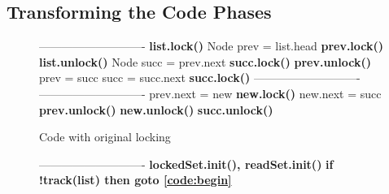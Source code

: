 \subsection{Transforming the Code Phases}\label{ssec:transformation}

\newcommand{\spOne}{\hspace{-3mm}\ }
\newcommand{\spZero}{\hspace{-3mm}}
\begin{figure*}
\codesize
	\begin{center}
	\begin{subfigure}[b]{.45\textwidth}
		\begin{algorithmic}[1]{}
		{\ttfamily
			 \label{code:begin}
			\Statex ----------------------------
			\State                               \label{code:beginRead}
            \State{\spOne}\textbf{list.lock()}
			\State{\spOne}Node prev = list.head
			\State{\spOne}\textbf{prev.lock()}
            \State{\spOne}\textbf{list.unlock()}
			\State{\spOne}Node succ = prev.next
			\State{\spOne}\textbf{succ.lock()}
			\State{\spOne}\textbf{prev.unlock()}
			\State{\spZero}prev = succ
			\State{\spZero}succ = succ.next
			\State{\spZero}\textbf{succ.lock()}  \label{code:endRead}
			\Statex ----------------------------
			\State                               \label{code:beginValidation}
			\State
			\State
			\State
			\State
			\State
			\State
            \State                               \label{code:endValidation}
			\Statex ----------------------------
			\State{\spZero}prev.next = new       \label{code:beginUpdate}
			\State{\spZero}\textbf{new.lock()}
			\State{\spZero}new.next = succ
            \State
			\State{\spZero}\textbf{prev.unlock()}
            \State
			\State{\spZero}\textbf{new.unlock()}
            \State
			\State{\spZero}\textbf{succ.unlock()}  \label{code:endUpdate}
			\EndFunction
			}
		\end{algorithmic}
		\caption{Code with original locking} \label{figure:transformation:before}
	\end{subfigure}
	\begin{subfigure}[b]{.45\textwidth}
		\begin{algorithmic}[1]{}
		{\ttfamily
			 \label{code:begin}
			\Statex ----------------------------
			\Comment{\textrm{read-only phase}}
            \State{\spOne}\textbf{lockedSet.init(), readSet.init()} \label{code:initSets}
            \State{\spOne}\textbf{if !track(list)  then {goto} \ref{code:begin}} \label{code:readGhaseGoto0}
}
\end{algorithmic}
\end{subfigure}
\end{center}
\end{figure*}
